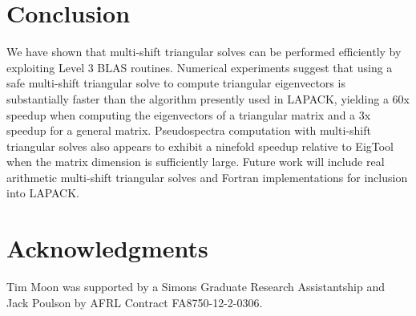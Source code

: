 \documentclass{article}
\begin{document}
\section{Conclusion}
We have shown that multi-shift triangular solves can be performed
efficiently by exploiting Level 3 BLAS routines. Numerical experiments
suggest that using a safe multi-shift triangular solve to compute
triangular eigenvectors is substantially faster than the algorithm
presently used in LAPACK, yielding a 60x speedup when computing the
eigenvectors of a triangular matrix and a 3x speedup for a general
matrix. Pseudospectra computation with multi-shift triangular solves
also appears to exhibit a ninefold speedup relative to EigTool when
the matrix dimension is sufficiently large.  Future work will include
real arithmetic multi-shift triangular solves and Fortran
implementations for inclusion into LAPACK.

\section{Acknowledgments}
Tim Moon was supported by a Simons Graduate Research Assistantship and
Jack Poulson by AFRL Contract FA8750-12-2-0306.

\appendix
\end{document}

